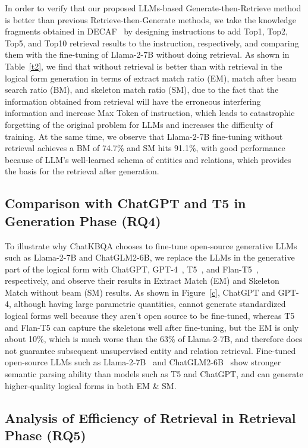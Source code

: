 \documentclass{article} \usepackage{iclr2024_conference,times}
\begin{document}
In order to verify that our proposed LLMs-based Generate-then-Retrieve method is better than previous Retrieve-then-Generate methods, we take the knowledge fragments obtained in DECAF~\citep{DECAF} by designing instructions to add Top1, Top2, Top5, and Top10 retrieval results to the instruction, respectively, and comparing them with the fine-tuning of Llama-2-7B without doing retrieval. 
As shown in Table~\ref{t2}, we find that without retrieval is better than with retrieval in the logical form generation in terms of extract match ratio (EM), match after beam search ratio (BM), and skeleton match ratio (SM), due to the fact that the information obtained from retrieval will have the erroneous interfering information and increase Max Token of instruction, which leads to catastrophic forgetting of the original problem for LLMs and increases the difficulty of training. At the same time, we observe that Llama-2-7B fine-tuning without retrieval achieves a BM of 74.7\% and SM hits 91.1\%, with good performance because of LLM's well-learned schema of entities and relations, which provides the basis for the retrieval after generation.


\subsection{Comparison with ChatGPT and T5 in Generation Phase (RQ4)}

To illustrate why ChatKBQA chooses to fine-tune open-source generative LLMs such as Llama-2-7B and ChatGLM2-6B, we replace the LLMs in the generative part of the logical form with ChatGPT, GPT-4~\citep{GPT4}, T5~\citep{T5}, and Flan-T5~\citep{Flan-T5}, respectively, and observe their results in Extract Match (EM) and Skeleton Match without beam (SM) results. 
As shown in Figure~\ref{c}, ChatGPT and GPT-4, although having large parametric quantities, cannot generate standardized logical forms well because they aren't open source to be fine-tuned, whereas T5 and Flan-T5 can capture the skeletons well after fine-tuning, but the EM is only about 10\%, which is much worse than the 63\% of Llama-2-7B, and therefore does not guarantee subsequent unsupervised entity and relation retrieval. Fine-tuned open-source LLMs such as Llama-2-7B~\citep{Llama2} and ChatGLM2-6B~\citep{GLM} show stronger semantic parsing ability than models such as T5 and ChatGPT, and can generate higher-quality logical forms in both EM \& SM.

\subsection{Analysis of Efficiency of Retrieval in Retrieval Phase (RQ5)}
\end{document}
